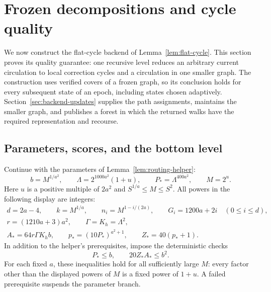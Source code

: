 \section{Frozen decompositions and cycle quality}
\label{sec:backend-quality}

We now construct the flat-cycle backend of
Lemma~\ref{lem:flat-cycle}.  This section proves its quality guarantee:
one recursive level reduces an arbitrary current circulation to local
correction cycles and a circulation in one smaller graph.  The construction
uses verified covers of a frozen graph, so its conclusion holds for every
subsequent state of an epoch, including states chosen adaptively.
Section~\ref{sec:backend-updates} supplies the path assignments, maintains
the smaller graph, and publishes a forest in which the returned walks have
the required representation and recourse.

\subsection{Parameters, scores, and the bottom level}

Continue with the parameters of Lemma~\ref{lem:routing-helper}:
\begin{equation}
\label{back:helper-parameters}
 b=M^{1/a^2},\qquad
 \Lambda=2^{1000a^2}(1+u),\qquad
 P_*=\Lambda^{400a^2},\qquad M=2^u.
\end{equation}
Here $u$ is a positive multiple of $2a^2$ and
$S^{1/a}\le M\le S^2$.  All powers in the following display are
integers:
\begin{equation}
\label{back:parameters}
\begin{gathered}
 d=2a-4,\qquad k=M^{1/a},\qquad
 n_i=M^{1-i/(2a)},\qquad G_i=1200a+2i
       \quad(0\le i\le d),\\
 r=(1210a+3)a^2,\qquad \Gamma=K_h=\Lambda^2,\\
 A_*=64r\Gamma K_h b,\qquad
 p_*=(10P_*)^{a^2+1},\qquad Z_*=40(p_*+1).
\end{gathered}
\end{equation}
In addition to the helper's prerequisites, impose the deterministic checks
\begin{equation}
\label{back:guards}
                 P_*\le b,\qquad 20Z_*A_*\le b^2.
\end{equation}
For each fixed $a$, these inequalities hold for all sufficiently large
$M$: every factor other than the displayed powers of $M$ is a fixed
power of $1+u$.  A failed prerequisite suspends the parameter branch.

